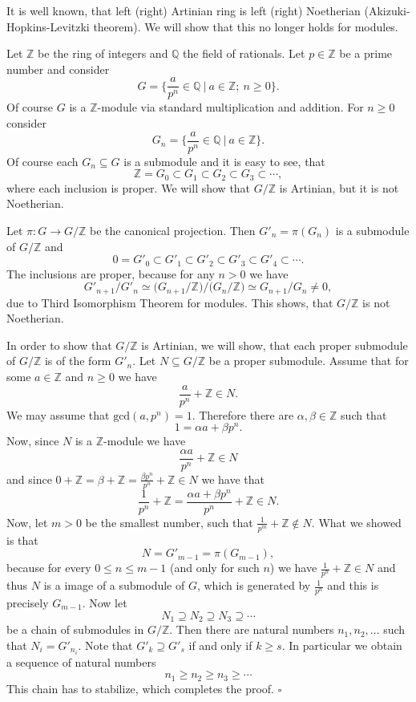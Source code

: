 \documentclass[12pt]{article}
\begin{document}
It is well known, that left (right) Artinian ring is left (right) Noetherian (Akizuki-Hopkins-Levitzki theorem). We will show that this no longer holds for modules.

Let $\mathbb{Z}$ be the ring of integers and $\mathbb{Q}$ the field of rationals. Let $p\in\mathbb{Z}$ be a prime number and consider 
$$G=\{\frac{a}{p^n}\in\mathbb{Q}\ |\ a\in\mathbb{Z};\ n\geq 0\}.$$
Of course $G$ is a $\mathbb{Z}$-module via standard multiplication and addition. For $n\geq 0$ consider
$$G_n=\{\frac{a}{p^n}\in\mathbb{Q}\ |\ a\in\mathbb{Z}\}.$$
Of course each $G_n\subseteq G$ is a submodule and it is easy to see, that
$$\mathbb{Z}=G_0\subset G_1\subset G_2\subset G_3\subset\cdots,$$
where each inclusion is proper. We will show that $G/\mathbb{Z}$ is Artinian, but it is not Noetherian.

Let $\pi:G\to G/\mathbb{Z}$ be the canonical projection. Then $G'_n=\pi(G_n)$ is a submodule of $G/\mathbb{Z}$ and
$$0=G'_0\subset G'_1\subset G'_2\subset G'_3\subset G'_4\subset\cdots.$$
The inclusions are proper, because for any $n>0$ we have 
$$G'_{n+1}/G'_{n}\simeq \big(G_{n+1}/\mathbb{Z}\big)/\big(G_{n}/\mathbb{Z}\big)\simeq G_{n+1}/G_n\neq 0,$$
due to Third Isomorphism Theorem for modules. This shows, that $G/\mathbb{Z}$ is not Noetherian.

In order to show that $G/\mathbb{Z}$ is Artinian, we will show, that each proper submodule of $G/\mathbb{Z}$ is of the form $G'_n$. Let $N\subseteq G/\mathbb{Z}$ be a proper submodule. Assume that for some $a\in\mathbb{Z}$ and $n\geq 0$ we have 
$$\frac{a}{p^n}+\mathbb{Z}\in N.$$
We may assume that $\mathrm{gcd}(a,p^n)=1$. Therefore there are $\alpha,\beta\in\mathbb{Z}$ such that
$$1=\alpha a+\beta p^n.$$
Now, since $N$ is a $\mathbb{Z}$-module we have
$$\frac{\alpha a}{p^n}+\mathbb{Z}\in N$$
and since $0+\mathbb{Z}=\beta+\mathbb{Z}=\frac{\beta p^n}{p^n}+\mathbb{Z}\in N$ we have that
$$\frac{1}{p^n}+\mathbb{Z}=\frac{\alpha a +\beta p^n}{p^n}+\mathbb{Z}\in N.$$
Now, let $m> 0$ be the smallest number, such that $\frac{1}{p^m}+\mathbb{Z}\not\in N$. What we showed is that
$$N=G'_{m-1}=\pi(G_{m-1}),$$
because for every $0\leq n\leq m-1$ (and only for such $n$) we have $\frac{1}{p^n}+\mathbb{Z}\in N$ and thus $N$ is a image of a submodule of $G$, which is generated by $\frac{1}{p^n}$ and this is precisely $G_{m-1}$. Now let
$$N_1\supseteq N_2\supseteq N_3\supseteq\cdots$$
be a chain of submodules in $G/\mathbb{Z}$. Then there are natural numbers $n_1,n_2,\ldots$ such that $N_i=G'_{n_i}$. Note that $G'_{k}\supseteq G'_{s}$ if and only if $k\geq s$. In particular we obtain a sequence of natural numbers
$$n_1\geq n_2\geq n_3\geq\cdots$$
This chain has to stabilize, which completes the proof. $\square$
\end{document}
